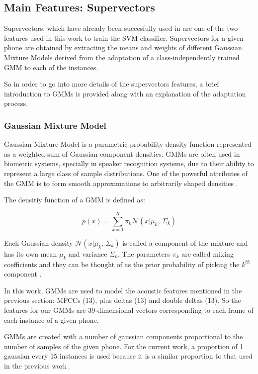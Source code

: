 \subsection{Main Features: Supervectors}

Supervectors, which have already been succesfully used in
\cite{supervectors, main} are one of the two features used in this work to train the SVM
classifier. Supervectors for a given phone are obtained by extracting the means and weights
of different
Gaussian Mixture Models derived from the adaptation of a class-independently trained GMM
to each of the instances.

So in order to go into more details of the supervectors features, a brief introduction to
GMMs is provided along with an explanation of the adaptation process.

\subsubsection{Gaussian Mixture Model}

Gaussian Mixture Model is a parametric probability density function represented as a weighted
sum of Gaussian component densities. GMMs are often used in biometric systems, specially
in speaker recognition systems, due to their ability to represent a large class of sample
distributions. One of the powerful attributes of the GMM is to form smooth approximations to
arbitrarily shaped densities \cite{gmm_reynolds}.

The densitiy function of a GMM is defined as:

\begin{equation}
  p(x) = \sum_{k=1}^{K}\pi_{k} \mathcal{N}(x|\mu_{k},\,\Sigma_{k})
\end{equation}

Each Gaussian density $\mathcal{N}(x|\mu_{k},\,\Sigma_{k})$ is called a component of the mixture
and has its own mean $\mu_{k}$ and variance $\Sigma_{k}$. The parameters $\pi_{k}$ are called
mixing coefficients and they can be thought of as the prior probability of picking the $k^{th}$
component \cite{gmm_bishop}.

In this work, GMMs are used to model the acoustic features mentioned in the previous section:
MFCCs (13), plus deltas (13) and double deltas (13). So the features for our GMMs are
39-dimensional vectors corresponding to each frame of each instance of a given phone.

GMMs are created with a number of gaussian components proportional to the number of samples
of the given phone. For the current work, a proportion of 1 gaussian every 15 instances is used
because it is a similar proportion to that used in the previous work \cite{main}.

